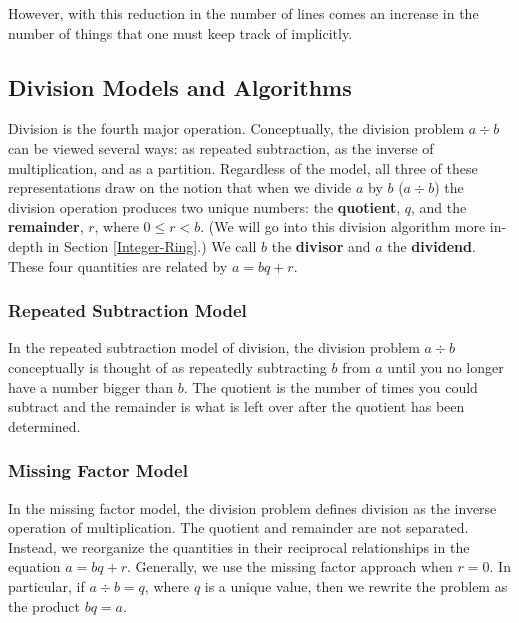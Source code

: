 \documentclass[
]{book}
\theoremstyle{definition}
\theoremstyle{definition}
\theoremstyle{definition}
\theoremstyle{definition}
\theoremstyle{remark}
\begin{document}
However, with this reduction in the number of lines comes an increase in the number of things that one must keep track of implicitly.

\hypertarget{division-models-and-algorithms}{%
\subsection{Division Models and Algorithms}\label{division-models-and-algorithms}}

Division is the fourth major operation. Conceptually, the division problem \(a \div b\) can be viewed several ways: as repeated subtraction, as the inverse of multiplication, and as a partition. Regardless of the model, all three of these representations draw on the notion that when we divide \(a\) by \(b\) (\(a\div b\)) the division operation produces two unique numbers: the \textbf{quotient}, \(q\), and the \textbf{remainder}, \(r\), where \(0\leq r <b\). (We will go into this division algorithm more in-depth in Section \ref{Integer-Ring}.) We call \(b\) the \textbf{divisor} and \(a\) the \textbf{dividend}. These four quantities are related by \(a=bq+r\).

\hypertarget{repeated-subtraction-model}{%
\subsubsection*{Repeated Subtraction Model}\label{repeated-subtraction-model}}

In the repeated subtraction model of division, the division problem \(a\div b\) conceptually is thought of as repeatedly subtracting \(b\) from \(a\) until you no longer have a number bigger than \(b\). The quotient is the number of times you could subtract and the remainder is what is left over after the quotient has been determined.

\hypertarget{missing-factor-model}{%
\subsubsection*{Missing Factor Model}\label{missing-factor-model}}

In the missing factor model, the division problem defines division as the inverse operation of multiplication. The quotient and remainder are not separated. Instead, we reorganize the quantities in their reciprocal relationships in the equation \(a=bq+r\). Generally, we use the missing factor approach when \(r=0\). In particular, if \(a\div b = q\), where \(q\) is a unique value, then we rewrite the problem as the product \(bq=a\).
\end{document}

